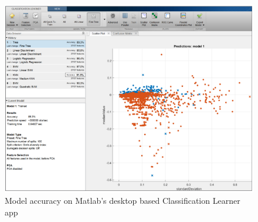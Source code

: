 \begin{figure}[ht]
 \centering %
 \includegraphics[width=140mm]{images/matlab-classification-learner.png}
 \caption{Model accuracy on Matlab's desktop based Classification Learner app}
 \label{fig:sample}
\end{figure}


